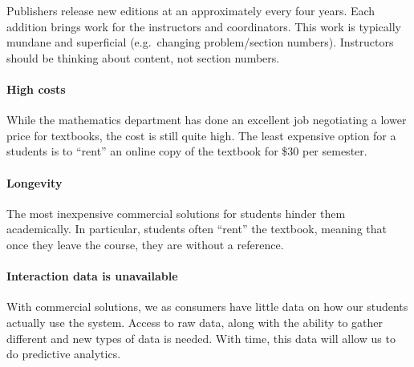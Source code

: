 \documentclass{ximera}
\begin{document}
Publishers release new editions at an approximately every four years.
Each addition brings work for the instructors and coordinators. This
work is typically mundane and superficial (e.g.\ changing
problem/section numbers). Instructors should be thinking about
content, not section numbers.




\paragraph{High costs}
While the mathematics department has done an excellent job negotiating
a lower price for textbooks, the cost is still quite high.  The least
expensive option for a students is to ``rent'' an online copy of the
textbook for \$30 per semester. 


\paragraph{Longevity}
The most inexpensive commercial solutions for students hinder them
academically. In particular, students often ``rent'' the textbook,
meaning that once they leave the course, they are without a reference.



\paragraph{Interaction data is unavailable}

With commercial solutions, we as consumers have little data on how our
students actually use the system. Access to raw data, along with the
ability to gather different and new types of data is needed. With
time, this data will allow us to do predictive analytics.

\end{document}
